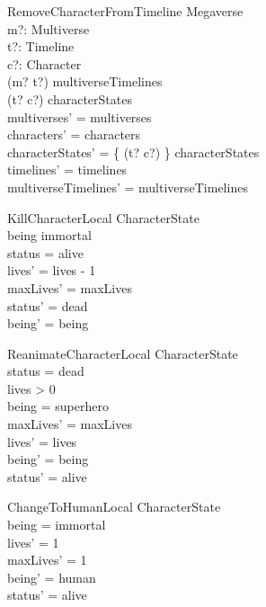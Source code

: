\documentclass{article}
\begin{document}
\begin{schema}{RemoveCharacterFromTimeline}
\Delta Megaverse \\
m?: Multiverse \\
t?: Timeline \\
c?: Character \\
\where
(m? \mapsto t?) \in multiverseTimelines \\
(t? \mapsto c?) \in \dom characterStates  \\
multiverses' = multiverses \\
characters' = characters \\
characterStates' = \{ (t? \mapsto c?) \} \ndres characterStates \\ 
timelines' = timelines \\
multiverseTimelines' = multiverseTimelines \\
\end{schema}

\begin{schema}{KillCharacterLocal} 
\Delta CharacterState \\
\where
being \neq immortal \\
status = alive \\
lives' = lives - 1 \\
maxLives' = maxLives \\
status' = dead \\
being' = being \\
\end{schema}

\begin{schema}{ReanimateCharacterLocal}
\Delta CharacterState \\
\where
status = dead \\
lives > 0 \\
being = superhero \\
maxLives' = maxLives \\
lives' = lives \\
being' = being \\
status' = alive \\
\end{schema}

\begin{schema}{ChangeToHumanLocal}
\Delta CharacterState \\
\where
being = immortal \\
lives' = 1 \\
maxLives' = 1 \\
being' = human \\
status' = alive \\
\end{schema}
\end{document}
